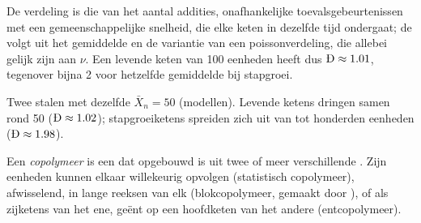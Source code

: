 \admitted

De verdeling is die van het aantal addities, onafhankelijke toevalsgebeurtenissen met een gemeenschappelijke snelheid, die
elke keten in dezelfde tijd ondergaat; de  volgt uit het gemiddelde en de variantie van een poissonverdeling,
die allebei gelijk zijn aan $\nu$. Een levende keten van 100 eenheden heeft dus $\text{\DH} \approx 1.01$, tegenover bijna 2 voor
hetzelfde gemiddelde bij stapgroei.

\begin{omfigure}

{\small Twee stalen met dezelfde $\bar X_n = 50$ (modellen). Levende ketens dringen samen rond 50 ($\text{\DH}
\approx 1.02$); stapgroeiketens spreiden zich uit van  tot honderden eenheden ($\text{\DH} \approx
1.98$).}
\end{omfigure}

\begin{definition}[Copolymeer]\label{def:b2:polymer-synthesis:copolymer}
Een \emph{copolymeer} is een  dat opgebouwd is uit twee of meer verschillende . Zijn eenheden
kunnen elkaar willekeurig opvolgen (statistisch copolymeer), afwisselend, in lange reeksen van elk
(blokcopolymeer, gemaakt door ), of als zijketens van het ene, geënt op een hoofdketen van het andere
(entcopolymeer).
\end{definition}

